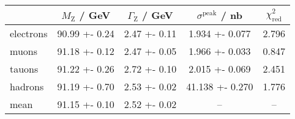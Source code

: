 \begin{tabular}{lS[table-format=2.2,table-figures-uncertainty=3]S[table-format=1.2,table-figures-uncertainty=3]S[table-format=2.3,table-figures-uncertainty=4]S[table-format=1.3]}
	\toprule
	{}& {$M_\mathrm{Z}$ / GeV} & {$\Gamma_\mathrm{Z}$ / GeV} & {$\sigma^\mathrm{peak}$ / nb} & {$\chi_\mathrm{red}^2$} \\
	\midrule
	electrons & 90.99 +- 0.24 & 2.47 +- 0.11 & 1.934 +- 0.077 & 2.796 \\
	muons & 91.18 +- 0.12 & 2.47 +- 0.05 & 1.966 +- 0.033 & 0.847 \\
	tauons & 91.22 +- 0.26 & 2.72 +- 0.10 & 2.015 +- 0.069 & 2.451 \\
	hadrons & 91.19 +- 0.70 & 2.53 +- 0.02 & 41.138 +- 0.270 & 1.776 \\	
	\midrule
	mean & 91.15 +- 0.10 & 2.52 +- 0.02 & {--} & {--} \\
	\bottomrule	
\end{tabular}